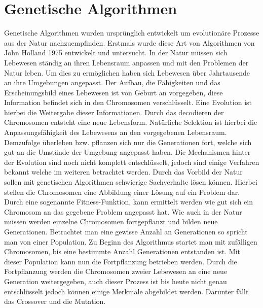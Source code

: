 \section{Genetische Algorithmen}
\label{sec:genetischer_algo}
Genetische Algorithmen wurden ursprünglich entwickelt um evolutionäre Prozesse aus der Natur nachzuempfinden. Erstmals wurde diese Art von Algorithmen von John Holland 1975 entwickelt und untersucht.
In der Natur müssen sich Lebewesen ständig an ihren Lebensraum anpassen und mit den Problemen der Natur leben. Um dies zu ermöglichen haben sich Lebewesen über Jahrtausende an ihre Umgebungen angepasst. Der Aufbau, die Fähigkeiten und das Erscheinungsbild eines Lebewesen ist von Geburt an vorgegeben, diese Information befindet sich in den Chromosomen verschlüsselt. Eine Evolution ist hierbei die Weitergabe dieser Informationen. Durch das decodieren der Chromosomen entsteht eine neue Lebensform.
Natürliche Selektion ist hierbei die Anpassungsfähigkeit des Lebewesens an den vorgegebenen Lebensraum. Demzufolge überleben bzw. pflanzen sich nur die Generationen fort, welche sich gut an die Umstände der Umgebung angepasst haben. Die Mechanismen hinter der Evolution sind noch nicht komplett entschlüsselt, jedoch sind einige Verfahren bekannt welche im weiteren betrachtet werden.
Durch das Vorbild der Natur sollen mit genetischen Algorithmen schwierige Sachverhalte lösen können. Hierbei stellen die Chromosomen eine Abbildung einer Lösung auf ein Problem dar. Durch eine sogenannte Fitness-Funktion, kann ermittelt werden wie gut sich ein Chromosom an das gegebene Problem angepasst hat. Wie auch in der Natur müssen werden einzelne Chromosomen fortgepflanzt und bilden neue Generationen. Betrachtet man eine gewisse Anzahl an Generationen so spricht man von einer Population. Zu Beginn des Algorithmus startet man mit zufälligen Chromosomen, bis eine bestimmte Anzahl Generationen entstanden ist. Mit dieser Population kann nun die Fortpflanzung betrieben werden.
Durch die Fortpflanzung werden die Chromosomen zweier Lebewesen an eine neue Generation weitergegeben, auch dieser Prozess ist bis heute nicht genau entschlüsselt jedoch können einige Merkmale abgebildet werden. Darunter fällt das Crossover und die Mutation.

